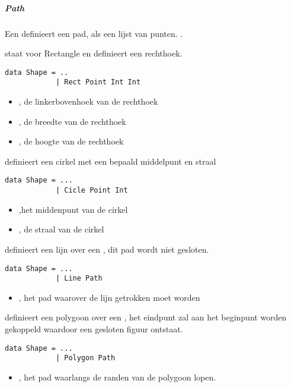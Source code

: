 \subparagraph{Path}
Een  definieert een pad, als een lijst van punten. .

 staat voor Rectangle en definieert een rechthoek. 
\begin{lstlisting}
data Shape = ..
			| Rect Point Int Int
\end{lstlisting}
\begin{itemize}
	\item {}, de linkerbovenhoek van de rechthoek
	\item {}, de breedte van de rechthoek
	\item {}, de hoogte van de rechthoek
\end{itemize}

 definieert een cirkel met een bepaald middelpunt en straal
\begin{lstlisting}
data Shape = ...
			| Cicle Point Int
\end{lstlisting}
\begin{itemize}
	\item {},het middenpunt van de cirkel
	\item {}, de straal van de cirkel
\end{itemize}

 definieert een lijn over een , dit pad wordt niet gesloten.
\begin{lstlisting}
data Shape = ...
			| Line Path
\end{lstlisting}
\begin{itemize}
	\item {}, het pad waarover de lijn getrokken moet worden
\end{itemize}		

 definieert een polygoon over een , het eindpunt zal aan het beginpunt worden gekoppeld waardoor een gesloten figuur ontstaat.
\begin{lstlisting}
data Shape = ...
			| Polygon Path
\end{lstlisting}
\begin{itemize}
	\item {}, het pad waarlangs de randen van de polygoon lopen.
\end{itemize}

